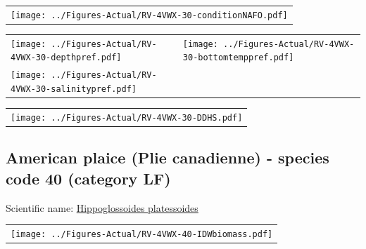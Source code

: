 \documentclass[12pt]{article}\usepackage[]{graphicx}\usepackage[]{color}
\begin{document}
\vspace{1cm}
\begin{minipage}{1.0\textwidth}
 \begin{tabular}{c}
\texttt{[image: ../Figures-Actual/RV-4VWX-30-conditionNAFO.pdf]} \\ 
\end{tabular} 
\end{minipage}
\clearpage
\begin{minipage}{1.0\textwidth}
 \begin{tabular}[t]{m{3in}m{3in}}
\texttt{[image: ../Figures-Actual/RV-4VWX-30-depthpref.pdf]} & 
\texttt{[image: ../Figures-Actual/RV-4VWX-30-bottomtemppref.pdf]} \\ 
\texttt{[image: ../Figures-Actual/RV-4VWX-30-salinitypref.pdf]} & 
 \\ 
\end{tabular} 
\end{minipage}
\newline

\vspace{1cm}
\begin{minipage}{1.0\textwidth}
 \begin{tabular}{c}
\texttt{[image: ../Figures-Actual/RV-4VWX-30-DDHS.pdf]} \\ 
\end{tabular} 
\end{minipage}
\clearpage

\renewcommand\thefigure{\thesubsection\Alph{figure}}

\setcounter{figure}{0}

\hypertarget{sec:40}{%
\subsection{American plaice (Plie canadienne) - species code 40 (category LF)}\label{sec:40}}

  


Scientific name: \href{http://www.marinespecies.org/aphia.php?p=taxdetails\&id=127137}{Hippoglossoides platessoides} \newline
\begin{minipage}{1.0\textwidth}
 \begin{tabular}{c}
\texttt{[image: ../Figures-Actual/RV-4VWX-40-IDWbiomass.pdf]} \\ 
\end{tabular} 
\end{minipage}
\newline
\end{document}
